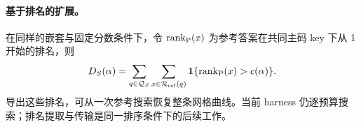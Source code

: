 \paragraph{基于排名的扩展。}
在同样的嵌套与固定分数条件下，令 $\operatorname{rank}_{\rm P}(x)$ 为参考答案在共同主码 key 下从 1 开始的排名，则
\begin{equation}
 D_S(\alpha)=\sum_{q\in\mathcal Q_S}\sum_{x\in\mathcal R_{\rm ref}(q)}
 \mathbf1\{\operatorname{rank}_{\rm P}(x)>c(\alpha)\}.
 \label{eq:6-rank-curve}
\end{equation}
导出这些排名，可从一次参考搜索恢复整条网格曲线。当前 harness 仍逐预算搜索；排名提取与传输是同一排序条件下的后续工作。
